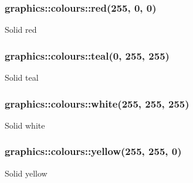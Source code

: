 \subsubsection[{\texorpdfstring{red}{red}}]{ graphics\+::colours\+::red(255, 0, 0)}\hypertarget{namespacegraphics_1_1colours_a8bc9dc7001921731ff76ca802f1a5b43}{}\label{namespacegraphics_1_1colours_a8bc9dc7001921731ff76ca802f1a5b43}
Solid red 
\subsubsection[{\texorpdfstring{teal}{teal}}]{ graphics\+::colours\+::teal(0, 255, 255)}\hypertarget{namespacegraphics_1_1colours_aceb03e157ae34836819a37e28605537b}{}\label{namespacegraphics_1_1colours_aceb03e157ae34836819a37e28605537b}
Solid teal 
\subsubsection[{\texorpdfstring{white}{white}}]{ graphics\+::colours\+::white(255, 255, 255)}\hypertarget{namespacegraphics_1_1colours_a77713a7d1bc4cbf45f37942cf43ada26}{}\label{namespacegraphics_1_1colours_a77713a7d1bc4cbf45f37942cf43ada26}
Solid white 
\subsubsection[{\texorpdfstring{yellow}{yellow}}]{ graphics\+::colours\+::yellow(255, 255, 0)}\hypertarget{namespacegraphics_1_1colours_aeadbc70fa5a266ebc8209f7180a069d6}{}\label{namespacegraphics_1_1colours_aeadbc70fa5a266ebc8209f7180a069d6}
Solid yellow 